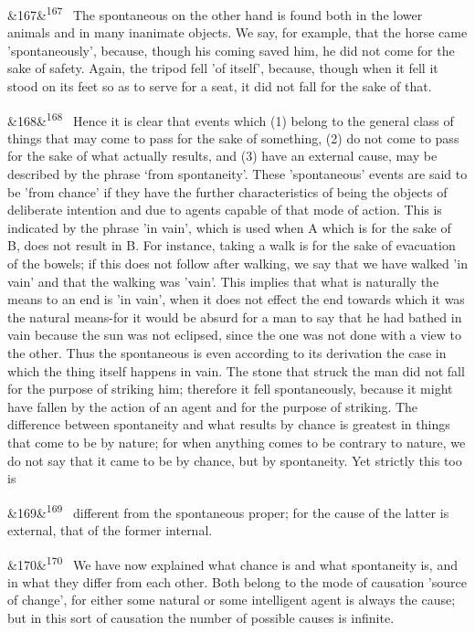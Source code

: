 \documentclass[12pt]{article}
\newcommand{\para}[1][]{\par\noindent\ifx&#1&\else\textsuperscript{\footnotesize #1}~\fi}
\begin{document}
\para[167] The spontaneous on the other hand is found both in the lower animals and in many inanimate objects. We say, for example, that the horse came 'spontaneously', because, though his coming saved him, he did not come for the sake of safety. Again, the tripod fell 'of itself’, because, though when it fell it stood on its feet so as to serve for a seat, it did not fall for the sake of that.

\para[168] Hence it is clear that events which (1) belong to the general class of things that may come to pass for the sake of something, (2) do not come to pass for the sake of what actually results, and (3) have an external cause, may be described by the phrase ‘from spontaneity'. These 'spontaneous' events are said to be 'from chance' if they have the further characteristics of being the objects of deliberate intention and due to agents capable of that mode of action. This is indicated by the phrase 'in vain’, which is used when A which is for the sake of B, does not result in B. For instance, taking a walk is for the sake of evacuation of the bowels; if this does not follow after walking, we say that we have walked 'in vain' and that the walking was 'vain'. This implies that what is naturally the means to an end is 'in vain', when it does not effect the end towards which it was the natural means-for it would be absurd for a man to say that he had bathed in vain because the sun was not eclipsed, since the one was not done with a view to the other. Thus the spontaneous is even according to its derivation the case in which the thing itself happens in vain. The stone that struck the man did not fall for the purpose of striking him; therefore it fell spontaneously, because it might have fallen by the action of an agent and for the purpose of striking. The difference between spontaneity and what results by chance is greatest in things that come to be by nature; for when anything comes to be contrary to nature, we do not say that it came to be by chance, but by spontaneity. Yet strictly this too is

\para[169] different from the spontaneous proper; for the cause of the latter is external, that of the former internal.

\para[170] We have now explained what chance is and what spontaneity is, and in what they differ from each other. Both belong to the mode of causation 'source of change’, for either some natural or some intelligent agent is always the cause; but in this sort of causation the number of possible causes is infinite.
\end{document}
